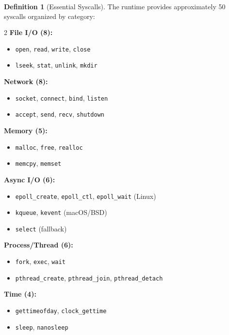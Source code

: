 \documentclass[12pt,a4paper]{article}
\theoremstyle{definition}
\newtheorem{definition}{Definition}[section]
\begin{document}
\begin{definition}[Essential Syscalls] \label{def:syscalls}
The runtime provides approximately 50 syscalls organized by category:

\begin{multicols}{2}
\textbf{File I/O (8):}
\begin{itemize}[noitemsep]
    \item \texttt{open}, \texttt{read}, \texttt{write}, \texttt{close}
    \item \texttt{lseek}, \texttt{stat}, \texttt{unlink}, \texttt{mkdir}
\end{itemize}

\textbf{Network (8):}
\begin{itemize}[noitemsep]
    \item \texttt{socket}, \texttt{connect}, \texttt{bind}, \texttt{listen}
    \item \texttt{accept}, \texttt{send}, \texttt{recv}, \texttt{shutdown}
\end{itemize}

\textbf{Memory (5):}
\begin{itemize}[noitemsep]
    \item \texttt{malloc}, \texttt{free}, \texttt{realloc}
    \item \texttt{memcpy}, \texttt{memset}
\end{itemize}

\textbf{Async I/O (6):}
\begin{itemize}[noitemsep]
    \item \texttt{epoll\_create}, \texttt{epoll\_ctl}, \texttt{epoll\_wait} (Linux)
    \item \texttt{kqueue}, \texttt{kevent} (macOS/BSD)
    \item \texttt{select} (fallback)
\end{itemize}

\textbf{Process/Thread (6):}
\begin{itemize}[noitemsep]
    \item \texttt{fork}, \texttt{exec}, \texttt{wait}
    \item \texttt{pthread\_create}, \texttt{pthread\_join}, \texttt{pthread\_detach}
\end{itemize}

\textbf{Time (4):}
\begin{itemize}[noitemsep]
    \item \texttt{gettimeofday}, \texttt{clock\_gettime}
    \item \texttt{sleep}, \texttt{nanosleep}
\end{itemize}


\end{multicols}
\end{definition}
\end{document}
